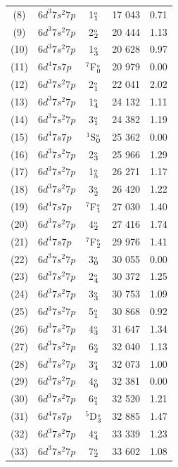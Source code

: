 \documentclass[10pt,a4paper, twoside, openright]{report}
\begin{document}
{\begin{longtable}{cl@{\hspace{0.5cm}}c@{\hspace{0.5cm}}r@{\hspace{0.5cm}}r}
(8) &   $6d^3 7s^2 7p$  &  1$_1^{\rm_o}$    & 17 043 & 0.71  \\  
 (9) &  $6d^3 7s^2 7p$  & 2$_2^{\rm_o}$    & 20 444 & 1.13  \\  
(10) &   $6d^3 7s^2 7p$  & 1$_3^{\rm_o}$    & 20 628 & 0.97   \\  
(11) &  $6d^4 7s 7p$  &  $^7$F$_0^{\rm_o}$   & 20 979 & 0.00  \\  
(12) &  $6d^3 7s^2 7p$  & 2$_1^{\rm_o}$     & 22 041 & 2.02   \\  
 (13) &  $6d^3 7s^2 7p$  &  1$_4^{\rm_o}$   & 24 132 & 1.11  \\ 
(14) &  $6d^3 7s^2 7p$  & 3$_1^{\rm_o}$    & 24 382 & 1.19  \\  
(15) &  $6d^4 7s 7p$  &  $^1$S$_0^{\rm_o}$   & 25 362 & 0.00 \\  
 (16) &  $6d^3 7s^2 7p$  & 2$_3^{\rm_o}$  & 25 966 & 1.29   \\  
 (17) &  $6d^3 7s^2 7p$  &  1$_{5}^{\rm_o}$   & 26 271 & 1.17  \\ 
(18) &   $6d^3 7s^2 7p$  & 3$_2^{\rm_o}$     & 26 420 & 1.22  \\
(19) &  $6d^4 7s 7p$  &  $^7$F$_1^{\rm_o}$  & 27 030 & 1.40  \\ 
(20) & $6d^3 7s^2 7p$  & 4$_2^{\rm_o}$   & 27 416 & 1.74  \\ 
(21) & $6d^4 7s  7p $  &  $^7$F$_2^{\rm_o}$   & 29 976 & 1.41   \\ 
(22) & $6d^3 7s^2 7p$  &  3$_0^{\rm_o}$ & 30 055 & 0.00 \\
(23) & $6d^3 7s^2 7p$  &  2$_4^{\rm_o}$ & 30 372 & 1.25 \\
(24) & $6d^3 7s^2 7p$ & 3$_3^{\rm_o}$  & 30 753 & 1.09 \\
(25) & $6d^3 7s^2 7p$  & 5$_1^{\rm_o}$  & 30 868 & 0.92 \\
(26) & $6d^3 7s^2 7p$ & 4$_3^{\rm_o}$ & 31 647 & 1.34  \\
(27) & $6d^3 7s^2 7p$  & 6$_2^{\rm_o}$  & 32 040 & 1.13 \\
(28) & $6d^3 7s^2 7p$  &  3$_4^{\rm_o}$ & 32 073 & 1.00  \\
(29) & $6d^3 7s^2 7p$ &  4$_0^{\rm_o}$ & 32 381 & 0.00 \\
(30) & $6d^3 7s^2 7p$ &  6$_1^{\rm_o}$  & 32 520 & 1.21  \\
(31) & $6d^4 7s  7p $  &  $^5$D$_3^{\rm_o}$ & 32 885 & 1.47  \\
(32) & $6d^3 7s^2 7p$  &  4$_4^{\rm_o}$ & 33 339 & 1.23  \\
(33) & $6d^3 7s^2 7p$  & 7$_2^{\rm_o}$  & 33 602 & 1.08 \\

\end{longtable}}
\end{document}
